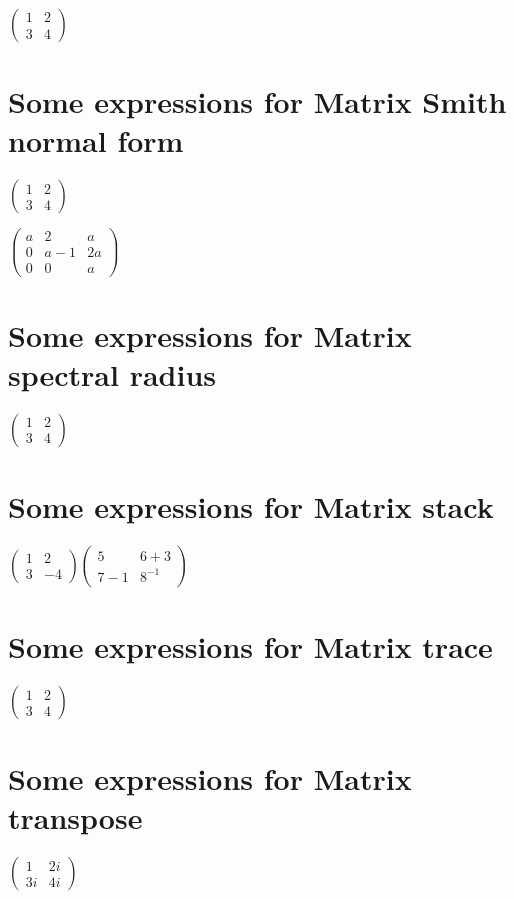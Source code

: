 \documentclass{article}
\begin{document}
$\left( 
\begin{array}{cc}
1 & 2 \\ 
3 & 4%
\end{array}%
\right) $

\section{Some expressions for Matrix Smith normal form}

$\left( 
\begin{array}{cc}
1 & 2 \\ 
3 & 4%
\end{array}%
\right) $

$\left( 
\begin{array}{ccc}
a & 2 & a \\ 
0 & a-1 & 2a \\ 
0 & 0 & a%
\end{array}%
\right) $

\section{Some expressions for Matrix spectral radius}

$\left( 
\begin{array}{cc}
1 & 2 \\ 
3 & 4%
\end{array}%
\right) $

\section{Some expressions for Matrix stack}

$\left( 
\begin{array}{cc}
1 & 2 \\ 
3 & -4%
\end{array}%
\right) \left( 
\begin{array}{cc}
5 & 6+3 \\ 
7-1 & 8^{-1}%
\end{array}%
\right) $

\section{Some expressions for Matrix trace}

$\left( 
\begin{array}{cc}
1 & 2 \\ 
3 & 4%
\end{array}%
\right) $

\section{Some expressions for Matrix transpose}

$\left( 
\begin{array}{cc}
1 & 2i \\ 
3i & 4i%
\end{array}%
\right) $
\end{document}
